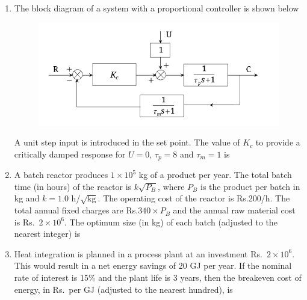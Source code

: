 \documentclass[journal,12pt,onecolumn]{IEEEtran}
\theoremstyle{remark}
\begin{document}
\begin{enumerate}
\item The block diagram of a system with a proportional controller is shown below
\begin{figure}[H]
    \centering
    \includegraphics[width=0.4\columnwidth]{figs/qn 42 .jpg}
    \caption{}
    \label{fig:qn42.jpg}
\end{figure}
A unit step input is introduced in the set point. The value of $K_c$ to provide a critically damped response for $U = 0$, $\tau_p = 8$ and $\tau_m = 1$ is
\hfill{}

\begin{enumerate}
\end{enumerate}

\item A batch reactor produces $1 \times 10^5$ kg of a product per year. The total batch time (in hours) of the reactor is $k\sqrt{P_B}$, where $P_B$ is the product per batch in kg and $k = 1.0$ h/$\sqrt{\text{kg}}$. The operating cost of the reactor is Rs.200/h. The total annual fixed charges are Rs.$340 \times P_B$ and the annual raw material cost is Rs.~$2 \times 10^6$. The optimum size (in kg) of each batch (adjusted to the nearest integer) is
\hfill{}
\begin{enumerate}
\end{enumerate}

\item Heat integration is planned in a process plant at an investment Rs.~$2\times10^6$. This would result in a net energy savings of 20 GJ per year. If the nominal rate of interest is 15\% and the plant life is 3 years, then the breakeven cost of energy, in Rs.~per GJ (adjusted to the nearest hundred), is
\hfill{}
\begin{enumerate}
\end{enumerate}


\end{enumerate}
\end{document}
